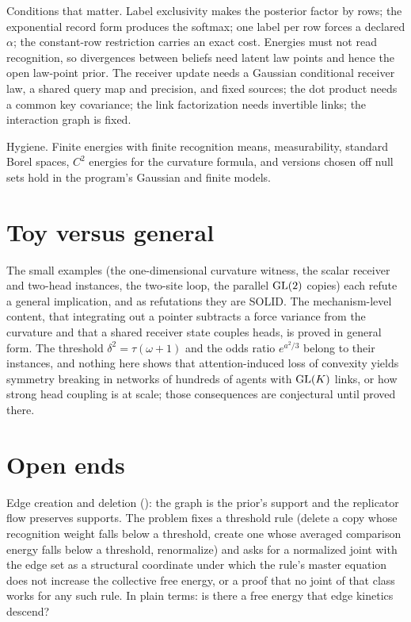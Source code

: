 \begin{hygiene}
Conditions that matter. Label exclusivity makes the posterior factor by rows; the exponential record form produces the
softmax; one label per row forces a declared $\alpha$; the constant-row restriction carries an exact cost. Energies must
not read recognition, so divergences between beliefs need latent law points and hence the open law-point prior. The
receiver update needs a Gaussian conditional receiver law, a shared query map and precision, and fixed sources; the dot
product needs a common key covariance; the link factorization needs invertible links; the interaction graph is fixed.

Hygiene. Finite energies with finite recognition means, measurability, standard Borel spaces, $C^2$ energies for the
curvature formula, and versions chosen off null sets hold in the program's Gaussian and finite models.
\end{hygiene}

\section{Toy versus general}
\label{comp:ch06-toy}

The small examples (the one-dimensional curvature witness, the scalar receiver and two-head instances, the two-site loop,
the parallel $\mathrm{GL}(2)$ copies) each refute a general implication, and as refutations they are SOLID. The mechanism-level
content, that integrating out a pointer subtracts a force variance from the curvature and that a shared receiver state
couples heads, is proved in general form. The threshold $\delta^2=\tau(\omega+1)$ and the odds ratio $e^{a^2/3}$ belong to
their instances, and nothing here shows that attention-induced loss of convexity yields symmetry breaking in networks of
hundreds of agents with $\mathrm{GL}(K)$ links, or how strong head coupling is at scale; those consequences are conjectural until
proved there.

\section{Open ends}
\label{comp:ch06-open}

Edge creation and deletion (): the graph is the prior's support and the replicator flow
preserves supports. The problem fixes a threshold rule (delete a copy whose recognition weight falls below a threshold,
create one whose averaged comparison energy falls below a threshold, renormalize) and asks for a normalized joint with the
edge set as a structural coordinate under which the rule's master equation does not increase the collective free energy, or
a proof that no joint of that class works for any such rule. In plain terms: is there a free energy that edge kinetics
descend?

